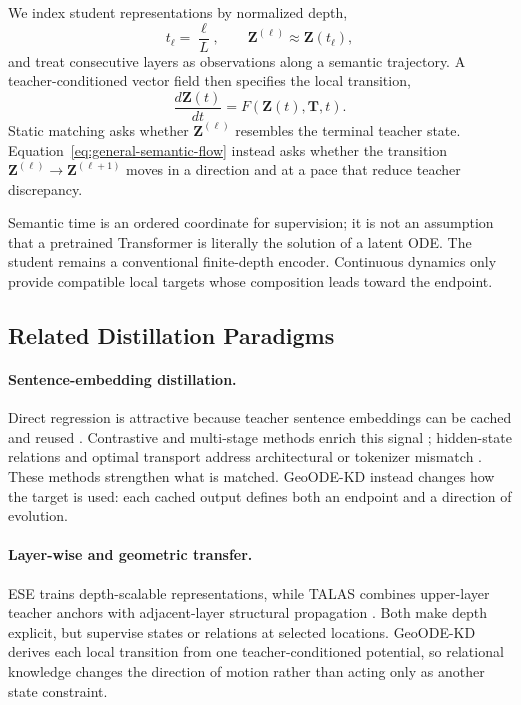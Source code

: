 We index student representations by normalized depth,
\begin{equation}
    t_\ell=\frac{\ell}{L},
    \qquad
    \mathbf{Z}^{(\ell)}\approx\mathbf{Z}(t_\ell),
    \label{eq:semantic-time}
\end{equation}
and treat consecutive layers as observations along a semantic trajectory. A
teacher-conditioned vector field then specifies the local transition,
\begin{equation}
    \frac{d\mathbf{Z}(t)}{dt}
    =F\!\left(\mathbf{Z}(t),\mathbf{T},t\right).
    \label{eq:general-semantic-flow}
\end{equation}
Static matching asks whether $\mathbf{Z}^{(\ell)}$ resembles the terminal
teacher state. Equation~\ref{eq:general-semantic-flow} instead asks whether the
transition $\mathbf{Z}^{(\ell)}\rightarrow\mathbf{Z}^{(\ell+1)}$ moves in a
direction and at a pace that reduce teacher discrepancy.

Semantic time is an ordered coordinate for supervision; it is not an assumption
that a pretrained Transformer is literally the solution of a latent ODE. The
student remains a conventional finite-depth encoder. Continuous dynamics only
provide compatible local targets whose composition leads toward the endpoint.

\subsection{Related Distillation Paradigms}
\label{sec:related-paradigms}

\paragraph{Sentence-embedding distillation.}
Direct regression is attractive because teacher sentence embeddings can be
cached and reused \citep{reimers2020multilingual}. Contrastive and multi-stage
methods enrich this signal \citep{xu2023distillcse,zhang2024jasper}; hidden-state
relations and optimal transport address architectural or tokenizer mismatch
\citep{truong2025emo}. These methods strengthen what is matched. GeoODE-KD
instead changes how the target is used: each cached output defines both an
endpoint and a direction of evolution.

\paragraph{Layer-wise and geometric transfer.}
ESE trains depth-scalable representations, while TALAS combines upper-layer
teacher anchors with adjacent-layer structural propagation
\citep{li2025ese,talas}. Both make depth explicit, but supervise states or
relations at selected locations. GeoODE-KD derives each local transition from
one teacher-conditioned potential, so relational knowledge changes the
direction of motion rather than acting only as another state constraint.

